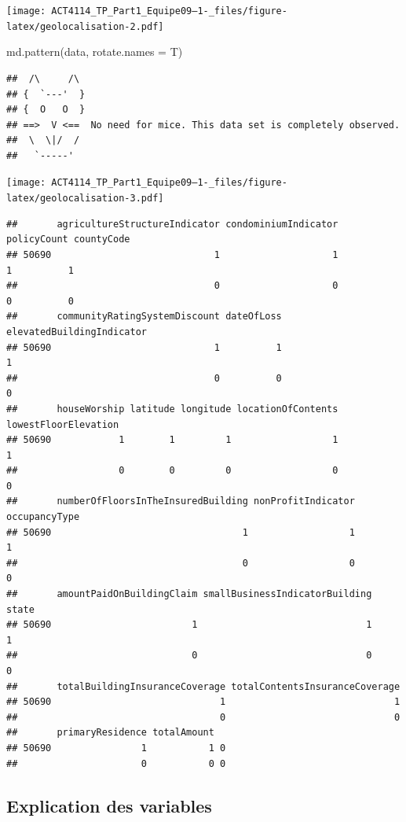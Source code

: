 \documentclass[
]{article}
\newenvironment{Shaded}{\begin{snugshade}}{\end{snugshade}}
\newcommand{\AttributeTok}[1]{\textcolor[rgb]{0.77,0.63,0.00}{#1}}
\newcommand{\FunctionTok}[1]{\textcolor[rgb]{0.00,0.00,0.00}{#1}}
\newcommand{\NormalTok}[1]{#1}
\begin{document}
\texttt{[image: ACT4114\_TP\_Part1\_Equipe09--1-\_files/figure-latex/geolocalisation-2.pdf]}

\begin{Shaded}
\begin{Highlighting}[]
\FunctionTok{md.pattern}\NormalTok{(data, }\AttributeTok{rotate.names =}\NormalTok{ T)}
\end{Highlighting}
\end{Shaded}

\begin{verbatim}
##  /\     /\
## {  `---'  }
## {  O   O  }
## ==>  V <==  No need for mice. This data set is completely observed.
##  \  \|/  /
##   `-----'
\end{verbatim}

\texttt{[image: ACT4114\_TP\_Part1\_Equipe09--1-\_files/figure-latex/geolocalisation-3.pdf]}

\begin{verbatim}
##       agricultureStructureIndicator condominiumIndicator policyCount countyCode
## 50690                             1                    1           1          1
##                                   0                    0           0          0
##       communityRatingSystemDiscount dateOfLoss elevatedBuildingIndicator
## 50690                             1          1                         1
##                                   0          0                         0
##       houseWorship latitude longitude locationOfContents lowestFloorElevation
## 50690            1        1         1                  1                    1
##                  0        0         0                  0                    0
##       numberOfFloorsInTheInsuredBuilding nonProfitIndicator occupancyType
## 50690                                  1                  1             1
##                                        0                  0             0
##       amountPaidOnBuildingClaim smallBusinessIndicatorBuilding state
## 50690                         1                              1     1
##                               0                              0     0
##       totalBuildingInsuranceCoverage totalContentsInsuranceCoverage
## 50690                              1                              1
##                                    0                              0
##       primaryResidence totalAmount  
## 50690                1           1 0
##                      0           0 0
\end{verbatim}

\hypertarget{explication-des-variables}{%
\subsection{Explication des variables}\label{explication-des-variables}}
\end{document}
